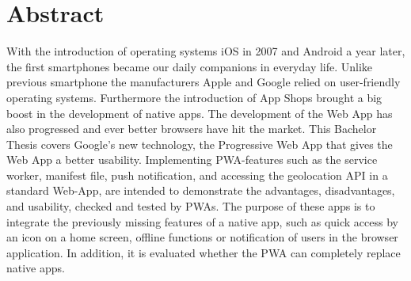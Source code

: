 \section*{\Large\bfseries Abstract}
With the introduction of operating systems iOS in 2007 and Android a year later, the first smartphones became our daily companions in everyday life. Unlike previous smartphone the manufacturers Apple and Google relied on user-friendly operating systems. Furthermore the introduction of App Shops brought a big boost in the development of native apps. The development of the Web App has also progressed and ever better browsers have hit the market. This Bachelor Thesis covers Google’s new technology, the Progressive Web App that gives the Web App a better usability. Implementing PWA-features such as the service worker, manifest file, push notification, and accessing the geolocation API in a standard Web-App, are intended to demonstrate the advantages, disadvantages, and usability, checked and tested by PWAs. The purpose of these apps is to integrate the previously missing features of a native app, such as quick access by an icon on a home screen, offline functions or notification of users in the browser application. In addition, it is evaluated whether the PWA can completely replace native apps.

